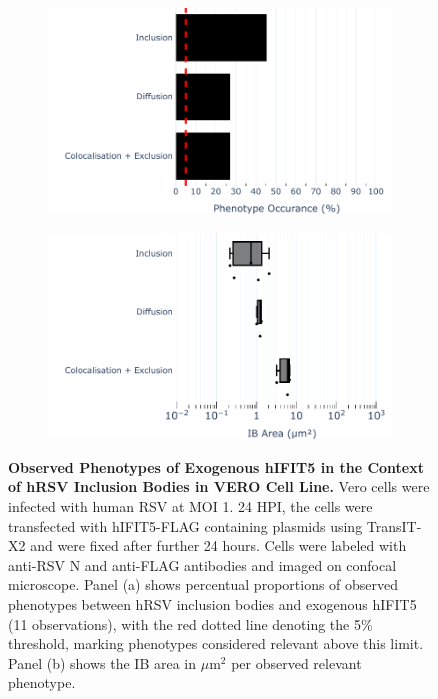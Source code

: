 \begin{figure}
    \begin{subfigure}{0.495\textwidth}
        \caption{}
        \includegraphics[width=1\linewidth]{09. Chapter 4/Figs/02. Overexpression/04. IFIT5/01. bar_i5_hrsv.pdf} 
    \end{subfigure}
    \begin{subfigure}{0.495\textwidth}
        \caption{}
        \includegraphics[width=1\linewidth]{09. Chapter 4/Figs/02. Overexpression/04. IFIT5/02. box_i5_hrsv.pdf}
    \end{subfigure}
    \caption[Observed Phenotypes of Exogenous hIFIT5 in the Context of hRSV Inclusion Bodies in VERO Cell Line.]{\textbf{Observed Phenotypes of Exogenous hIFIT5 in the Context of hRSV Inclusion Bodies in VERO Cell Line.} Vero cells were infected with human RSV at MOI 1. 24 HPI, the cells were transfected with hIFIT5-FLAG containing plasmids using TransIT-X2 and were fixed after further 24 hours. Cells were labeled with anti-RSV N and anti-FLAG antibodies and imaged on confocal microscope. Panel (a) shows percentual proportions of observed phenotypes between hRSV inclusion bodies and exogenous hIFIT5 (11 observations), with the red dotted line denoting the 5\% threshold, marking phenotypes considered relevant above this limit. Panel (b) shows the IB area in \(\mu \mbox{m}^2\) per observed relevant phenotype.}
    \label{fig:Observed Phenotypes of Exogenous hIFIT5 in the Context of hRSV Inclusion Bodies in VERO Cell Line}
\end{figure}

